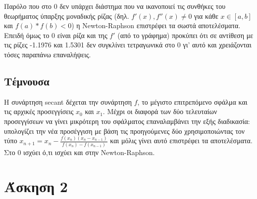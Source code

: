 \documentclass[a4paper,11pt]{article}
\begin{document}
\begin{flushleft}
Παρόλο που στο 0 δεν υπάρχει διάστημα που να ικανοποιεί τις συνθήκες του θεωρήματος ύπαρξης μοναδικής ρίζας (δηλ. $f'(x),f''(x)\neq0$ για κάθε $x\in[a,b]$ και $f(a)*f(b)<0$) η Newton-Raphson επιστρέφει τα σωστά αποτελέσματα.
Επειδή όμως το 0 είναι ρίζα και της $f'$ (από το γράφημα) προκύπει ότι σε αντίθεση με τις ρίζες -1.1976 και 1.5301 δεν συγκλίνει τετραγωνικά στο 0 γι' αυτό και χρειάζονται τόσες παραπάνω επαναλήψεις.
\linebreak

\subsection*{Τέμνουσα}
Η συνάρτηση secant δέχεται την συνάρτηση $f$, το μέγιστο επιτρεπόμενο σφάλμα και τις αρχικές προσεγγίσεις $x_0$ και $x_1$. Μέχρι οι διαφορά των δύο τελευταίων προσεγγίσεων να γίνει μικρότερη του σφάλματος επαναλαμβάνει την εξής διαδικασία: υπολογίζει την νέα προσέγγιση με βάση τις προηγούμενες δύο χρησιμοποιώντας τον τύπο $x_{n+1} = x_n-\frac{f(x_n)(x_n-x_{n-1})}{f(x_n)-f(x_{n-1})}$ και μόλις γίνει αυτό επιστρέφει τα αποτελέσματα. 
\linebreak
Στο 0 ισχύει ό,τι ισχύει και στην Newton-Raphson.


\section*{Άσκηση 2}

\end{flushleft}
\end{document}
